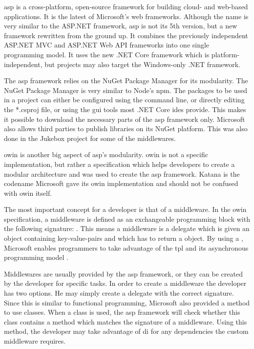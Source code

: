



\gls{asp} is a cross-platform, open-source framework for building cloud- and web-based applications. It is the latest of Microsoft's web frameworks. Although the name is very similar to the ASP.NET framework, \gls{asp} is not its 5th version, but a new framework rewritten from the ground up. It combines the previously independent ASP.NET MVC and ASP.NET Web API frameworks into one single programming model. It uses the new .NET Core framework which is platform-independent, but projects may also target the Windows-only .NET framework. \cite{introASP}


The \gls{asp} framework relies on the NuGet Package Manager for its modularity. The NuGet Package Manager is very similar to Node's \gls{npm}. The packages to be used in a project can either be configured using the command line, or directly editing the *.csproj file, or using the \gls{gui} tools most .NET Core \gls{ide}s provide. This makes it possible to download the necessary parts of the \gls{asp} framework only. Microsoft also allows third parties to publish libraries on its NuGet platform. This was also done in the Jukebox project for some of the middlewares.


\gls{owin} is another big aspect of \gls{asp}'s modularity. \gls{owin} is not a specific implementation, but rather a specification which helps developers to create a modular architecture and was used to create the \gls{asp} framework. Katana is the codename Microsoft gave its \gls{owin} implementation and should not be confused with \gls{owin} itself.

The most important concept for a developer is that of a middleware. In the \gls{owin} specification, a middleware is defined as an exchangeable programming block with the following signature: . This means a middleware is a delegate which is given an  object containing key-value-pairs and which has to return a  object. By using a , Microsoft enables programmers to take advantage of the \gls{tpl} and its asynchronous programming model \cite{tpl}.

Middlewares are usually provided by the \gls{asp} framework, or they can be created by the developer for specific tasks. In order to create a middleware the developer has two options. He may simply create a delegate with the correct signature. Since this is similar to functional programming, Microsoft also provided a method to use classes. When a class is used, the \gls{asp} framework will check whether this class contains a method which matches the signature of a middleware. Using this method, the developer may take advantage of \gls{di} for any dependencies the custom middleware requires. \cite{owinKatana}

